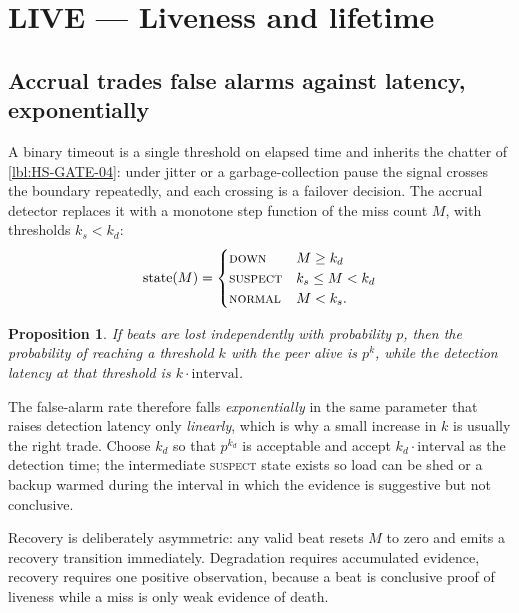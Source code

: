 \documentclass[11pt]{article}
\newtheorem{prop}{Proposition}[section]
\begin{document}
\section{LIVE --- Liveness and lifetime}

\subsection{Accrual trades false alarms against latency, exponentially}
\label{lbl:HS-LIVE-01}

A binary timeout is a single threshold on elapsed time and inherits the
chatter of \ref{lbl:HS-GATE-04}: under jitter or a garbage-collection pause the
signal crosses the boundary repeatedly, and each crossing is a failover
decision. The accrual detector replaces it with a monotone step function of the
miss count $M$, with thresholds $k_s < k_d$:
\begin{equation}
\mathrm{state}(M) = \begin{cases}
\textsc{down} & M \ge k_d \\
\textsc{suspect} & k_s \le M < k_d \\
\textsc{normal} & M < k_s .
\end{cases}
\end{equation}

\begin{prop}
If beats are lost independently with probability $p$, then the probability of
reaching a threshold $k$ with the peer alive is $p^{k}$, while the detection
latency at that threshold is $k \cdot \mathrm{interval}$.
\end{prop}

The false-alarm rate therefore falls \emph{exponentially} in the same parameter
that raises detection latency only \emph{linearly}, which is why a small
increase in $k$ is usually the right trade. Choose $k_d$ so that $p^{k_d}$ is
acceptable and accept $k_d \cdot \mathrm{interval}$ as the detection time; the
intermediate \textsc{suspect} state exists so load can be shed or a backup
warmed during the interval in which the evidence is suggestive but not
conclusive.

Recovery is deliberately asymmetric: any valid beat resets $M$ to zero and
emits a recovery transition immediately. Degradation requires accumulated
evidence, recovery requires one positive observation, because a beat is
conclusive proof of liveness while a miss is only weak evidence of death.
\end{document}
